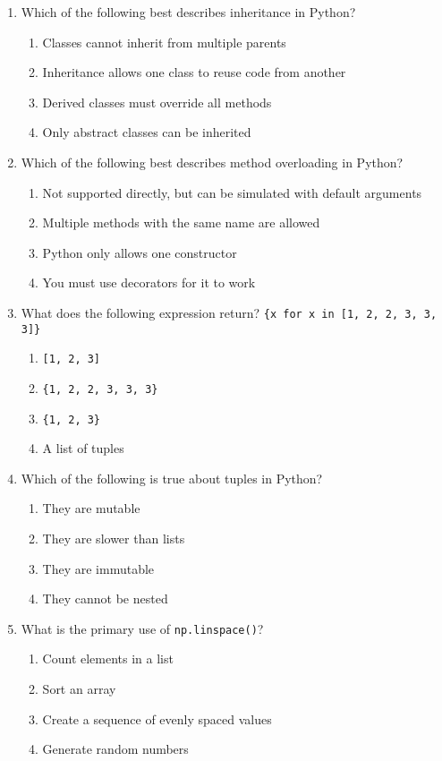 \documentclass[12pt]{article}
\begin{document}
\begin{enumerate}[label=\arabic*.]
\item Which of the following best describes inheritance in Python?  
\begin{enumerate}[label=\Alph*.]
\item Classes cannot inherit from multiple parents  
\item Inheritance allows one class to reuse code from another  
\item Derived classes must override all methods  
\item Only abstract classes can be inherited  
\end{enumerate}

\item Which of the following best describes method overloading in Python?  
\begin{enumerate}[label=\Alph*.]
\item Not supported directly, but can be simulated with default arguments  
\item Multiple methods with the same name are allowed  
\item Python only allows one constructor  
\item You must use decorators for it to work  
\end{enumerate}

\item What does the following expression return?  
\texttt{\{x for x in [1, 2, 2, 3, 3, 3]\}}  
\begin{enumerate}[label=\Alph*.]
\item \texttt{[1, 2, 3]}
\item \texttt{\{1, 2, 2, 3, 3, 3\}}
\item \texttt{\{1, 2, 3\}}
\item A list of tuples
\end{enumerate}

\item Which of the following is true about tuples in Python?  
\begin{enumerate}[label=\Alph*.]
\item They are mutable  
\item They are slower than lists  
\item They are immutable  
\item They cannot be nested  
\end{enumerate}

\item What is the primary use of \texttt{np.linspace()}?  
\begin{enumerate}[label=\Alph*.]
\item Count elements in a list  
\item Sort an array  
\item Create a sequence of evenly spaced values  
\item Generate random numbers  
\end{enumerate}

\end{enumerate}
\end{document}
